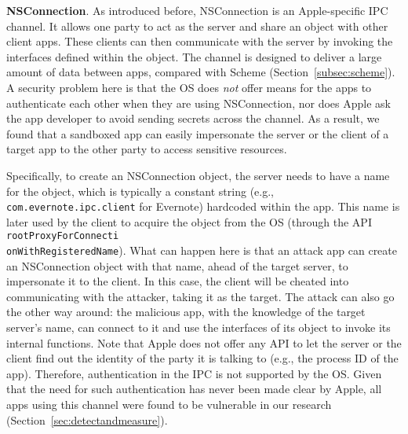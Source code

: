 \documentclass{article}
\begin{document}
\vspace {3pt}\noindent\textbf{NSConnection}. As introduced before, NSConnection is an Apple-specific IPC channel. It allows one party to act as the server and share an object with other client apps.  These clients can then communicate with the server by invoking the interfaces defined within the object.  The channel is designed to deliver a large amount of data between apps, compared with Scheme (Section~\ref{subsec:scheme}). A security problem here is that the OS does \textit{not} offer means for the apps to authenticate each other when they are using NSConnection, nor does Apple ask the app developer to avoid sending secrets across the channel. As a result, we found that a sandboxed app can easily impersonate the server or the client of a target app to the other party to access sensitive resources.




Specifically, to create an NSConnection object, the server needs to have a name for the object, which is typically a constant string (e.g., \texttt{com.evernote.ipc.client} for Evernote) hardcoded within the app.  This name is later used by the client to acquire the object from the OS (through the API \texttt{rootProxyForConnecti\\onWithRegisteredName}). What can happen here is that an attack app can create an NSConnection object with that name, ahead of the target server, to impersonate it to the client.  In this case, the client will be cheated into communicating with the attacker, taking it as the target. The attack can also go the other way around: the malicious app, with the knowledge of the target server's name, can connect to it and use the interfaces of its object to invoke its internal functions. Note that Apple does not offer any API to let the server or the client find out the identity of the party it is talking to (e.g., the process ID of the app).  Therefore, authentication in the IPC is not supported by the OS. Given that the need for such authentication has never been made clear by Apple, all apps using this channel were found to be vulnerable in our research (Section~\ref{sec:detectandmeasure}).
\end{document}
